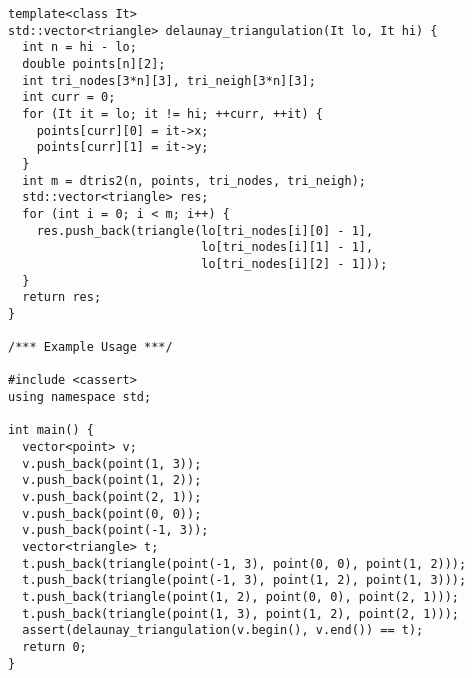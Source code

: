\begin{lstlisting}
template<class It>
std::vector<triangle> delaunay_triangulation(It lo, It hi) {
  int n = hi - lo;
  double points[n][2];
  int tri_nodes[3*n][3], tri_neigh[3*n][3];
  int curr = 0;
  for (It it = lo; it != hi; ++curr, ++it) {
    points[curr][0] = it->x;
    points[curr][1] = it->y;
  }
  int m = dtris2(n, points, tri_nodes, tri_neigh);
  std::vector<triangle> res;
  for (int i = 0; i < m; i++) {
    res.push_back(triangle(lo[tri_nodes[i][0] - 1],
                           lo[tri_nodes[i][1] - 1],
                           lo[tri_nodes[i][2] - 1]));
  }
  return res;
}

/*** Example Usage ***/

#include <cassert>
using namespace std;

int main() {
  vector<point> v;
  v.push_back(point(1, 3));
  v.push_back(point(1, 2));
  v.push_back(point(2, 1));
  v.push_back(point(0, 0));
  v.push_back(point(-1, 3));
  vector<triangle> t;
  t.push_back(triangle(point(-1, 3), point(0, 0), point(1, 2)));
  t.push_back(triangle(point(-1, 3), point(1, 2), point(1, 3)));
  t.push_back(triangle(point(1, 2), point(0, 0), point(2, 1)));
  t.push_back(triangle(point(1, 3), point(1, 2), point(2, 1)));
  assert(delaunay_triangulation(v.begin(), v.end()) == t);
  return 0;
}
\end{lstlisting}
